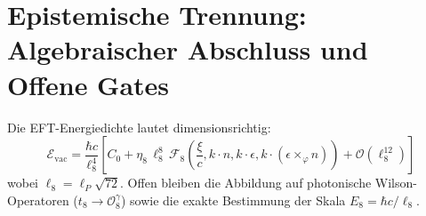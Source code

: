 \documentclass[11pt,a4paper]{article}
\begin{document}
\section{Epistemische Trennung: Algebraischer Abschluss und Offene Gates}
Die EFT-Energiedichte lautet dimensionsrichtig:
$$\mathcal{E}_{\text{vac}} = \frac{\hbar c}{\ell_8^4} \left[ C_0 + \eta_8 \, \ell_8^8 \, \mathscr{F}_8\left(\frac{\xi}{c}, k\cdot n, k\cdot\epsilon, k\cdot(\epsilon\times_\varphi n)\right) + \mathcal{O}(\ell_8^{12}) \right]$$
wobei $\ell_8 = \ell_P \sqrt{72}$. Offen bleiben die Abbildung auf photonische Wilson-Operatoren ($t_8 \to \mathcal{O}_8^\gamma$) sowie die exakte Bestimmung der Skala $E_8 = \hbar c / \ell_8$.
\end{document}
